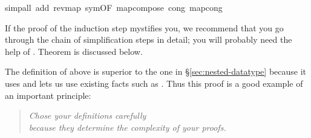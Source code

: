 \begin{isabellebody}
\begin{isamarkuptxt}
\end{isamarkuptxt}%
\isamarkupfalse%
simp{\isacharunderscore}all\ add{\isacharcolon}\ rev{\isacharunderscore}map\ sym{\isacharbrackleft}OF\ map{\isacharunderscore}compose{\isacharbrackright}\ cong{\isacharcolon}\ map{\isacharunderscore}cong{\isacharparenright}%
\endisatagproof
{\isafoldproof}%
%
\isadelimproof
%
\endisadelimproof
\isamarkuptrue%
%
\begin{isamarkuptext}%
\noindent
If the proof of the induction step mystifies you, we recommend that you go through
the chain of simplification steps in detail; you will probably need the help of
. Theorem  is discussed below.

The definition of  above is superior to the one in
\S\ref{sec:nested-datatype} because it uses 
and lets us use existing facts such as \hbox{}.
Thus this proof is a good example of an important principle:
\begin{quote}
\emph{Chose your definitions carefully\\
because they determine the complexity of your proofs.}
\end{quote}


\end{isamarkuptext}
\end{isabellebody}
